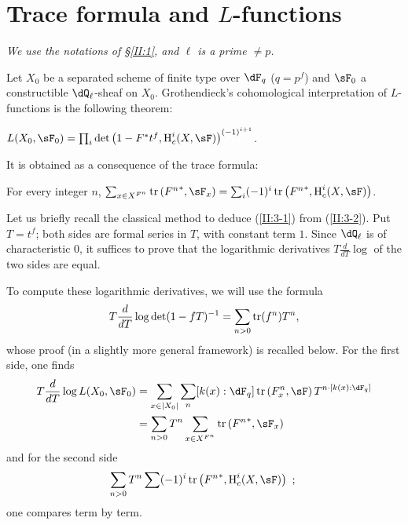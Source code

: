 \section{Trace formula and \texorpdfstring{$L$}{L}-functions}\label{II:3}

\emph{We use the notations of \S\ref{II:1}, and $\ell$ is a prime
$\ne p$.}

Let $X_0$ be a separated scheme of finite type over $\dF_q$ ($q=p^f$) and
$\sF_0$ a constructible $\dQ_\ell$-sheaf on $X_0$. Grothendieck's
cohomological interpretation of $L$-functions is the following theorem:




\begin{theorem_}\label{II:3-1}
$L(X_0,\sF_0) = \prod_i \det\left(1-F^* t^f, \h_c^i(X,\sF)\right)^{(-1)^{i+1}}$.
\end{theorem_}

It is obtained as a consequence of the trace formula:




\begin{theorem_}\label{II:3-2}
For every integer $n$,
$\sum_{x\in X^{F^n}} \tr\left({F^n}^*,\sF_x\right) = \sum_i (-1)^i \tr\left({F^n}^*,\h_c^i(X,\sF)\right)$.
\end{theorem_}




Let us briefly recall the classical method to deduce (\ref{II:3-1})
from (\ref{II:3-2}). Put $T=t^f$; both sides are formal series
in $T$, with constant term $1$. Since $\dQ_\ell$ is of characteristic
$0$, it suffices to prove that the logarithmic derivatives
$T\frac{d}{dT}\log$ of the two sides are equal.

To compute these logarithmic derivatives, we will use the formula
\[
  T \frac{d}{dT}\log\det(1-f T)^{-1} = \sum_{n>0} \operatorname{tr}(f^n) T^n \text{,}
\]
whose proof (in a slightly more general framework) is recalled
below. For the first side, one finds
\begin{align*}
  T\frac{d}{dT}\log L(X_0,\sF_0)
    &= \sum_{x\in |X_0|} \sum_n [k(x):\dF_q] \tr\left(F_x^n,\sF\right) T^{n\cdot[k(x):\dF_q]} \\
    &= \sum_{n>0} T^n \sum_{x\in X^{F^n}} \tr\left({F^n}^*,\sF_x\right)
\end{align*}
and for the second side
\[
  \sum_{n>0} T^n \sum (-1)^i \tr\left({F^n}^*,\h_c^i(X,\sF)\right) \text{ ; }
\]
one compares term by term.




